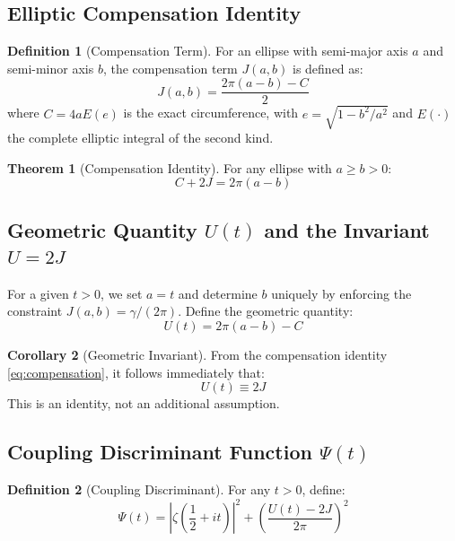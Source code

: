 \documentclass[11pt,a4paper]{article}
\theoremstyle{definition}
\newtheorem{theorem}{Theorem}[section]
\newtheorem{corollary}[theorem]{Corollary}
\newtheorem{definition}{Definition}[section]
\begin{document}
\subsection{Elliptic Compensation Identity}

\begin{definition}[Compensation Term]
For an ellipse with semi-major axis \(a\) and semi-minor axis \(b\), the compensation term \(J(a,b)\) is defined as:
\begin{equation}
J(a,b) = \frac{2\pi(a-b) - C}{2}
\end{equation}
where \(C = 4a E(e)\) is the exact circumference, with \(e = \sqrt{1 - b^2/a^2}\) and \(E(\cdot)\) the complete elliptic integral of the second kind.
\end{definition}

\begin{theorem}[Compensation Identity]\label{thm:compensation}
For any ellipse with \(a \geq b > 0\):
\begin{equation}
C + 2J = 2\pi(a-b)
\end{equation}
\end{theorem}

\subsection{Geometric Quantity \(U(t)\) and the Invariant \(U = 2J\)}

For a given \(t > 0\), we set \(a = t\) and determine \(b\) uniquely by enforcing the constraint \(J(a,b) = \gamma/(2\pi)\). 
Define the geometric quantity:
\begin{equation}\label{eq:Udef}
U(t) = 2\pi(a-b) - C
\end{equation}

\begin{corollary}[Geometric Invariant]\label{cor:U2J}
From the compensation identity \eqref{eq:compensation}, it follows immediately that:
\begin{equation}
U(t) \equiv 2J
\end{equation}
This is an identity, not an additional assumption.
\end{corollary}

\subsection{Coupling Discriminant Function \(\Psi(t)\)}

\begin{definition}[Coupling Discriminant]
For any \(t > 0\), define:
\begin{equation}\label{eq:Psi}
\Psi(t) = \left|\zeta\left(\frac{1}{2}+it\right)\right|^2 + \left( \frac{U(t)-2J}{2\pi} \right)^2
\end{equation}
\end{definition}
\end{document}
